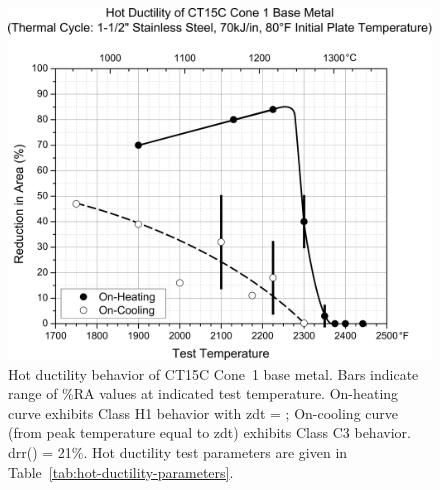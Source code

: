 {\begin{figure}[h!]
    \setlength{\abovecaptionskip}{15pt}
    \centering
    \includegraphics[width=6in]{figures/hot-ductility/c1-hot-ductility-curve.pdf}
    \caption[Hot ductility behavior of Cone~1 base metal.]{Hot ductility behavior of CT15C Cone~1 base metal. Bars indicate range of \%RA values at indicated test temperature. On-heating curve exhibits Class H1 behavior with \gls{zdt} = ; On-cooling curve (from peak temperature equal to \gls{zdt}) exhibits Class C3 behavior.  \gls{drr}() = 21\%. Hot ductility test parameters are given in Table~\ref{tab:hot-ductility-parameters}.}
    \label{fig:c1-hot-ductility}
\end{figure}

}
